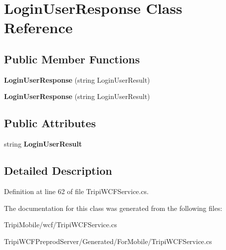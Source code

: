 \hypertarget{class_login_user_response}{
\section{LoginUserResponse Class Reference}
\label{class_login_user_response}
}
\subsection*{Public Member Functions}
\begin{DoxyCompactItemize}
\item 
\hypertarget{class_login_user_response_a1698188028a7514f4992d28099a1a6f7}{
{\bfseries LoginUserResponse} (string LoginUserResult)}
\label{class_login_user_response_a1698188028a7514f4992d28099a1a6f7}

\item 
\hypertarget{class_login_user_response_a1698188028a7514f4992d28099a1a6f7}{
{\bfseries LoginUserResponse} (string LoginUserResult)}
\label{class_login_user_response_a1698188028a7514f4992d28099a1a6f7}

\end{DoxyCompactItemize}
\subsection*{Public Attributes}
\begin{DoxyCompactItemize}
\item 
\hypertarget{class_login_user_response_aa97806ae4a33983c58c38aaf0220f310}{
string {\bfseries LoginUserResult}}
\label{class_login_user_response_aa97806ae4a33983c58c38aaf0220f310}

\end{DoxyCompactItemize}


\subsection{Detailed Description}


Definition at line 62 of file TripiWCFService.cs.

The documentation for this class was generated from the following files:\begin{DoxyCompactItemize}
\item 
TripiMobile/wcf/TripiWCFService.cs\item 
TripiWCFPreprodServer/Generated/ForMobile/TripiWCFService.cs\end{DoxyCompactItemize}

